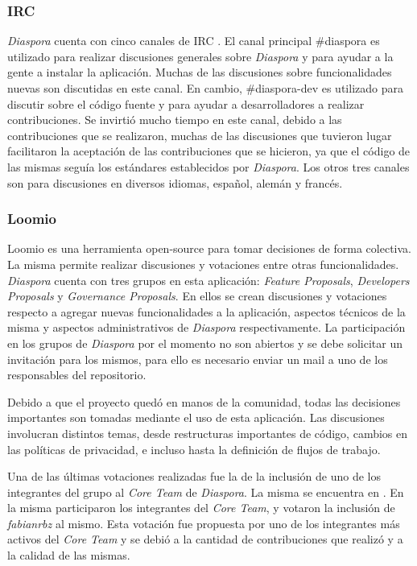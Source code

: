 \subsubsection{IRC}

\emph{Diaspora} cuenta con cinco canales de IRC \cite{irc}. El canal principal \#diaspora es utilizado para realizar discusiones generales sobre \emph{Diaspora} y para ayudar a la 
gente a instalar la aplicación. Muchas de las discusiones sobre funcionalidades nuevas son discutidas en este canal. En cambio, \#diaspora-dev es utilizado para discutir sobre el 
código fuente y para ayudar a desarrolladores a realizar contribuciones. Se invirtió mucho tiempo en este canal, debido a las contribuciones que se realizaron, muchas de las 
discusiones que tuvieron lugar facilitaron la aceptación de las contribuciones que se hicieron, ya que el código de las mismas seguía los estándares establecidos por \emph{Diaspora}. 
Los otros tres canales son para discusiones en diversos idiomas, español, alemán y francés.

\subsubsection{Loomio}

Loomio  es una herramienta open-source para tomar decisiones de forma colectiva. La misma permite realizar discusiones y votaciones entre otras funcionalidades. \emph{Diaspora} 
cuenta con tres grupos en esta aplicación: \emph{Feature Proposals}, \emph{Developers Proposals} y \emph{Governance Proposals}. En ellos se crean discusiones y votaciones 
respecto a agregar nuevas funcionalidades a la aplicación, aspectos técnicos de la misma y aspectos administrativos de \emph{Diaspora} respectivamente. La participación en los 
grupos de \emph{Diaspora} por el momento no son abiertos y se debe solicitar un invitación para los mismos, para ello es necesario enviar un mail a uno de los responsables del repositorio.

Debido a que el proyecto quedó en manos de la comunidad, todas las decisiones importantes son tomadas mediante el uso de esta aplicación. Las discusiones involucran distintos temas, desde  restructuras importantes de código, cambios en las políticas de privacidad, e incluso hasta la definición de flujos de trabajo.

Una de las últimas votaciones realizadas fue la de la inclusión de uno de los integrantes del grupo al \emph{Core Team} de \emph{Diaspora}. La misma se encuentra en 
\cite{loomio_fabian}. En la misma participaron los integrantes del \emph{Core Team}, y votaron la inclusión de \emph{fabianrbz} al mismo. Esta votación fue propuesta por uno de los integrantes más activos del \emph{Core Team} y se debió a la cantidad de contribuciones que realizó y a la calidad de las mismas.

